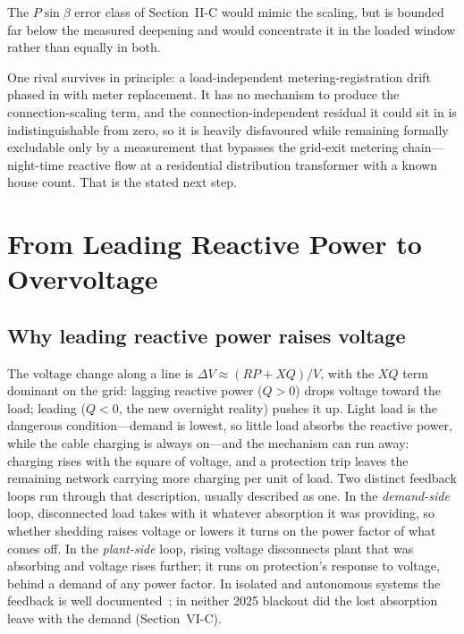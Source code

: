 \documentclass[journal]{IEEEtran}
\begin{document}
The $P\sin\beta$ error class of Section~II-C
would mimic the scaling, but is bounded far below the measured deepening and would
concentrate it in the loaded window rather than equally in both.

One rival survives in principle: a load-independent metering-registration drift
phased in with meter replacement. It has no mechanism to produce the
connection-scaling term, and the connection-independent residual it could sit in
is indistinguishable from zero, so it is heavily disfavoured while remaining formally excludable only by a measurement that bypasses the grid-exit metering
chain---night-time reactive flow at a residential distribution transformer with a
known house count. That is the stated next step.

\section{From Leading Reactive Power to Overvoltage}
\subsection{Why leading reactive power raises voltage}
The voltage change along a line is $\Delta V \approx (RP+XQ)/V$, with the $XQ$ term dominant on the grid:
lagging reactive power ($Q>0$) drops voltage toward the load; leading ($Q<0$, the
new overnight reality) pushes it up. Light load is the dangerous condition---demand
is lowest, so little load absorbs the reactive power, while the cable charging is
always on---and the mechanism can run away: charging rises with the square of
voltage, and a protection trip leaves the remaining network carrying more
charging per unit of load. Two distinct feedback loops run through that description, usually described as
one. In the \emph{demand-side} loop, disconnected load takes with it whatever
absorption it was providing, so whether shedding raises voltage or lowers it turns
on the power factor of what comes off. In the \emph{plant-side} loop, rising
voltage disconnects plant that was absorbing and voltage rises further; it runs on
protection's response to voltage, behind a demand of any power factor. In isolated and autonomous systems the feedback is well
documented~\cite{vournas2021}; in neither 2025 blackout did the lost
absorption leave with the demand (Section~VI-C).
\end{document}
